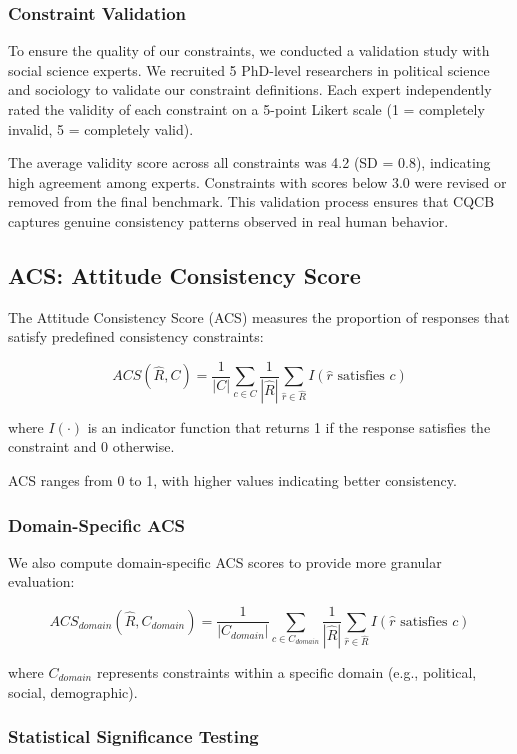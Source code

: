 \documentclass[sigconf, anonymous]{acmart}
\begin{document}
\subsubsection{Constraint Validation}

To ensure the quality of our constraints, we conducted a validation study with social science experts. We recruited 5 PhD-level researchers in political science and sociology to validate our constraint definitions. Each expert independently rated the validity of each constraint on a 5-point Likert scale (1 = completely invalid, 5 = completely valid).

The average validity score across all constraints was 4.2 (SD = 0.8), indicating high agreement among experts. Constraints with scores below 3.0 were revised or removed from the final benchmark. This validation process ensures that CQCB captures genuine consistency patterns observed in real human behavior.

\subsection{ACS: Attitude Consistency Score}

The Attitude Consistency Score (ACS) measures the proportion of responses that satisfy predefined consistency constraints:

\[
ACS(\hat{R}, C) = \frac{1}{|C|} \sum_{c \in C} \frac{1}{|\hat{R}|} \sum_{\hat{r} \in \hat{R}} I(\hat{r} \text{ satisfies } c)
\]

where $I(\cdot)$ is an indicator function that returns 1 if the response satisfies the constraint and 0 otherwise.

ACS ranges from 0 to 1, with higher values indicating better consistency.

\subsubsection{Domain-Specific ACS}

We also compute domain-specific ACS scores to provide more granular evaluation:

\[
ACS_{domain}(\hat{R}, C_{domain}) = \frac{1}{|C_{domain}|} \sum_{c \in C_{domain}} \frac{1}{|\hat{R}|} \sum_{\hat{r} \in \hat{R}} I(\hat{r} \text{ satisfies } c)
\]

where $C_{domain}$ represents constraints within a specific domain (e.g., political, social, demographic).

\subsubsection{Statistical Significance Testing}
\end{document}
